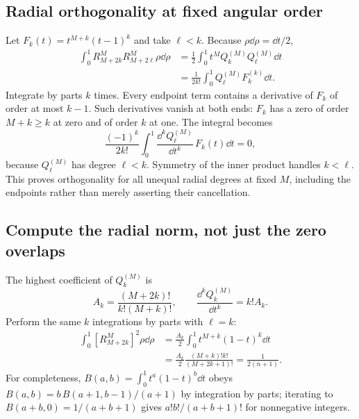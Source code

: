\subsection{Radial orthogonality at fixed angular order}
Let $F_k(t)=t^{M+k}(t-1)^k$ and take $\ell<k$. Because $\rho\dd\rho=\dd t/2$,
\begin{align}
\int_0^1R_{M+2k}^M R_{M+2\ell}^M\rho\dd\rho
&=\frac12\int_0^1t^M Q_k^{(M)}Q_\ell^{(M)}\dd t\\
&=\frac{1}{2k!}\int_0^1Q_\ell^{(M)}F_k^{(k)}\dd t.
\end{align}
Integrate by parts $k$ times. Every endpoint term contains a derivative of $F_k$ of order at most $k-1$. Such derivatives vanish at both ends: $F_k$ has a zero of order $M+k\geq k$ at zero and of order $k$ at one. The integral becomes
\begin{equation}
\frac{(-1)^k}{2k!}\int_0^1
\frac{\dd^k Q_\ell^{(M)}}{\dd t^k}\,F_k(t)\dd t=0,
\end{equation}
because $Q_\ell^{(M)}$ has degree $\ell<k$. Symmetry of the inner product handles $k<\ell$. This proves orthogonality for all unequal radial degrees at fixed $M$, including the endpoints rather than merely asserting their cancellation.

\subsection{Compute the radial norm, not just the zero overlaps}
The highest coefficient of $Q_k^{(M)}$ is
\begin{equation}
A_k=\frac{(M+2k)!}{k!(M+k)!},\qquad
\frac{\dd^kQ_k^{(M)}}{\dd t^k}=k!A_k.
\end{equation}
Perform the same $k$ integrations by parts with $\ell=k$:
\begin{align}
\int_0^1[R_{M+2k}^M]^2\rho\dd\rho
&=\frac{A_k}{2}\int_0^1t^{M+k}(1-t)^k\dd t\\
&=\frac{A_k}{2}\frac{(M+k)!k!}{(M+2k+1)!}
=\boxed{\frac1{2(n+1)}}.
\end{align}
For completeness, $B(a,b)=\int_0^1t^a(1-t)^b\dd t$ obeys
$B(a,b)=b\,B(a+1,b-1)/(a+1)$ by integration by parts; iterating to
$B(a+b,0)=1/(a+b+1)$ gives $a!b!/(a+b+1)!$ for nonnegative integers.

